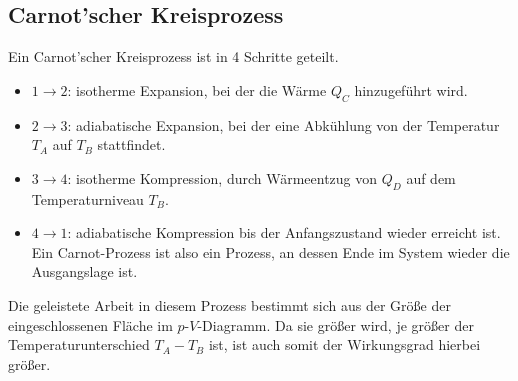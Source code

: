 \documentclass[12pt,a4paper,titlepage,headinclude,bibtotoc]{scrartcl}
\begin{document}
\subsection{Carnot'scher Kreisprozess}
Ein Carnot'scher Kreisprozess ist in 4 Schritte geteilt.
\begin{itemize}
	\item $1\rightarrow 2$: isotherme Expansion, bei der die Wärme $Q_C$ hinzugeführt wird.
	\item $2\rightarrow 3$: adiabatische Expansion, bei der eine Abkühlung von der Temperatur $T_A$ auf $T_B$ stattfindet.
	\item $3\rightarrow 4$: isotherme Kompression, durch Wärmeentzug von $Q_D$ auf dem Temperaturniveau $T_B$.
	\item $4\rightarrow 1$: adiabatische Kompression bis der Anfangszustand wieder erreicht ist.
		Ein Carnot-Prozess ist also ein Prozess, an dessen Ende im System wieder die Ausgangslage ist.
\end{itemize}
Die geleistete Arbeit in diesem Prozess bestimmt sich aus der Größe der eingeschlossenen Fläche im $p$-$V$-Diagramm.
Da sie größer wird, je größer der Temperaturunterschied $T_A-T_B$ ist, ist auch somit der Wirkungsgrad hierbei größer.
\end{document}
